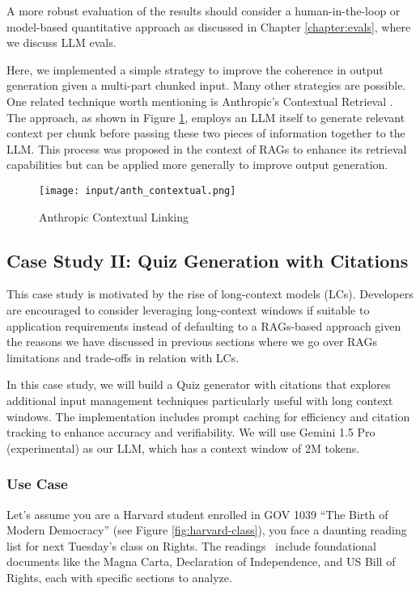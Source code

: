 A more robust evaluation of the results should consider a human-in-the-loop or model-based quantitative approach as discussed in Chapter \ref{chapter:evals}, where we discuss LLM evals.

Here, we implemented a simple strategy to improve the coherence in output generation given a multi-part chunked input. Many other strategies are possible. One related technique worth mentioning is Anthropic's Contextual Retrieval . The approach, as shown in Figure \ref{fig:anth_contextual}, employs an LLM itself to generate relevant context per chunk before passing these two pieces of information together to the LLM. This process was proposed in the context of RAGs to enhance its retrieval capabilities but can be applied more generally to improve output generation.

\begin{figure}[H]
\centering
\texttt{[image: input/anth\_contextual.png]}
\caption{Anthropic Contextual Linking \cite{anthropic2024contextualretrieval}}
\label{fig:anth_contextual}
\end{figure}

\subsection{Case Study II: Quiz Generation with Citations}

This case study is motivated by the rise of long-context models (LCs). Developers are encouraged to consider leveraging long-context windows if suitable to application requirements instead of defaulting to a RAGs-based approach given the reasons we have discussed in previous sections where we go over RAGs limitations and trade-offs in relation with LCs.

In this case study, we will build a Quiz generator with citations that explores additional input management techniques particularly useful with long context windows. The implementation includes prompt caching for efficiency and citation tracking to enhance accuracy and verifiability. We will use Gemini 1.5 Pro (experimental) as our LLM, which has a context window of 2M tokens.

\subsubsection{Use Case}

Let's assume you are a Harvard student enrolled in GOV 1039 ``The Birth of Modern Democracy'' (see Figure \ref{fig:harvard-class}), you face a daunting reading list for next Tuesday's class on Rights. The readings~ include foundational documents like the Magna Carta, Declaration of Independence, and US Bill of Rights, each with specific sections to analyze.

